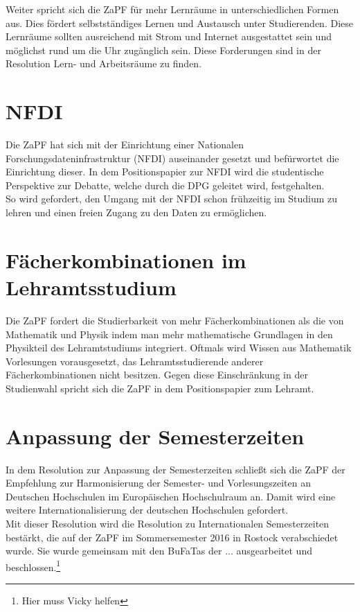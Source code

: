 Weiter spricht sich die ZaPF für mehr Lernräume in unterschiedlichen Formen aus. Dies fördert selbstständiges Lernen und Austausch unter Studierenden. Diese Lernräume sollten ausreichend mit Strom und Internet ausgestattet sein und möglichst rund um die Uhr zugänglich sein. Diese Forderungen sind in der Resolution \glqq Lern- und Arbeitsräume \grqq{} zu finden.

\section*{NFDI}
Die ZaPF hat sich mit der Einrichtung einer Nationalen Forschungsdateninfrastruktur (NFDI) auseinander gesetzt und befürwortet die Einrichtung dieser. In dem Positionspapier zur NFDI wird die studentische Perspektive zur Debatte, welche durch die DPG geleitet wird, festgehalten.\\
So wird gefordert, den Umgang mit der NFDI schon frühzeitig im Studium zu lehren und einen freien Zugang zu den Daten zu ermöglichen.

\section*{Fächerkombinationen im Lehramtsstudium}
Die ZaPF fordert die Studierbarkeit von mehr Fächerkombinationen als die von Mathematik und Physik indem man mehr mathematische Grundlagen in den Physikteil des Lehramtstudiums integriert. Oftmals wird Wissen aus Mathematik Vorlesungen vorausgesetzt, das Lehramtsstudierende anderer Fächerkombinationen nicht besitzen. Gegen diese Einschränkung in der Studienwahl spricht sich die ZaPF in dem Positionspapier zum Lehramt. 

\section*{Anpassung der Semesterzeiten}
In dem Resolution zur Anpassung der Semesterzeiten schließt sich die ZaPF der \glqq Empfehlung zur Harmonisierung der Semester- und Vorlesungszeiten an Deutschen Hochschulen im Europäischen Hochschulraum \grqq{} an. Damit wird eine weitere Internationalisierung der deutschen Hochschulen gefordert.\\
Mit dieser Resolution wird die Resolution zu Internationalen Semesterzeiten bestärkt, die auf der ZaPF im Sommersemester 2016 in Rostock verabschiedet wurde. Sie wurde gemeinsam mit den BuFaTas der ... ausgearbeitet und beschlossen.\footnote{Hier muss Vicky helfen}

